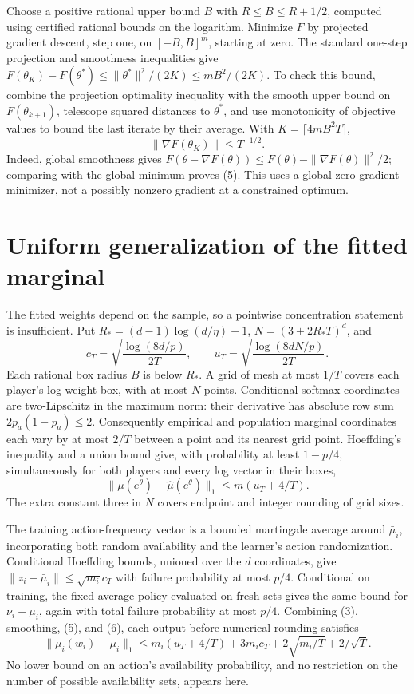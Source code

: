 \documentclass[11pt,a4paper]{article}
\begin{document}
Choose a positive rational upper bound $B$ with $R\le B\le R+1/2$, computed using certified rational bounds on the logarithm. Minimize $F$ by projected gradient descent, step one, on $[-B,B]^m$, starting at zero. The standard one-step projection and smoothness inequalities give $F(\theta_K)-F(\theta^*)\le\|\theta^*\|^2/(2K)\le mB^2/(2K)$. To check this bound, combine the projection optimality inequality with the smooth upper bound on $F(\theta_{k+1})$, telescope squared distances to $\theta^*$, and use monotonicity of objective values to bound the last iterate by their average. With $K=\lceil4mB^2T\rceil$,
\[
 \|\nabla F(\theta_K)\|\le T^{-1/2}. \tag{5}
\]
Indeed, global smoothness gives $F(\theta-\nabla F(\theta))\le F(\theta)-\|\nabla F(\theta)\|^2/2$; comparing with the global minimum proves (5). This uses a global zero-gradient minimizer, not a possibly nonzero gradient at a constrained optimum.

\section{Uniform generalization of the fitted marginal}
The fitted weights depend on the sample, so a pointwise concentration statement is insufficient. Put $R_*=(d-1)\log(d/\eta)+1$, $N=(3+2R_*T)^d$, and
\[
 c_T=\sqrt{\frac{\log(8d/p)}{2T}},\qquad
 u_T=\sqrt{\frac{\log(8dN/p)}{2T}}.
\]
Each rational box radius $B$ is below $R_*$. A grid of mesh at most $1/T$ covers each player's log-weight box, with at most $N$ points. Conditional softmax coordinates are two-Lipschitz in the maximum norm: their derivative has absolute row sum $2p_a(1-p_a)\le2$. Consequently empirical and population marginal coordinates each vary by at most $2/T$ between a point and its nearest grid point. Hoeffding's inequality and a union bound give, with probability at least $1-p/4$, simultaneously for both players and every log vector in their boxes,
\[
 \|\mu(e^\theta)-\widehat\mu(e^\theta)\|_1
 \le m(u_T+4/T). \tag{6}
\]
The extra constant three in $N$ covers endpoint and integer rounding of grid sizes.

The training action-frequency vector is a bounded martingale average around $\bar\mu_i$, incorporating both random availability and the learner's action randomization. Conditional Hoeffding bounds, unioned over the $d$ coordinates, give $\|z_i-\bar\mu_i\|\le\sqrt{m_i}c_T$ with failure probability at most $p/4$. Conditional on training, the fixed average policy evaluated on fresh sets gives the same bound for $\bar\nu_i-\bar\mu_i$, again with total failure probability at most $p/4$. Combining (3), smoothing, (5), and (6), each output before numerical rounding satisfies
\[
 \|\mu_i(w_i)-\bar\mu_i\|_1
 \le m_i(u_T+4/T)+3m_ic_T+
                   2\sqrt{m_i/T}+2/\sqrt T. \tag{7}
\]
No lower bound on an action's availability probability, and no restriction on the number of possible availability sets, appears here.
\end{document}
